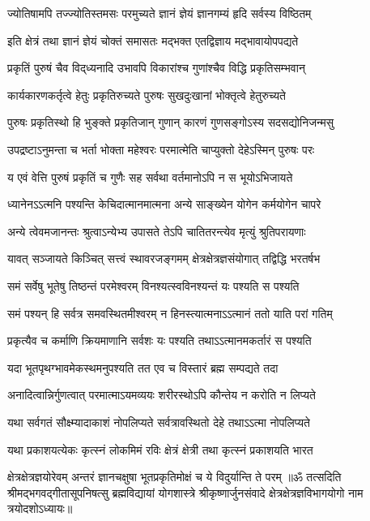 \twolineshloka
{ज्योतिषामपि तज्ज्योतिस्तमसः परमुच्यते}
{ज्ञानं ज्ञेयं ज्ञानगम्यं हृदि सर्वस्य विष्ठितम्}%

\twolineshloka
{इति क्षेत्रं तथा ज्ञानं ज्ञेयं चोक्तं समासतः}
{मद्भक्त एतद्विज्ञाय मद्भावायोपपद्यते}%

\twolineshloka
{प्रकृतिं पुरुषं चैव विद्‌ध्यनादि उभावपि}
{विकारांश्च गुणांश्चैव विद्धि प्रकृतिसम्भवान्}%

\twolineshloka
{कार्यकारणकर्तृत्वे हेतुः प्रकृतिरुच्यते}
{पुरुषः सुखदुःखानां भोक्तृत्वे हेतुरुच्यते}%

\twolineshloka
{पुरुषः प्रकृतिस्थो हि भुङ्क्ते प्रकृतिजान् गुणान्}
{कारणं गुणसङ्गोऽस्य सदसद्योनिजन्मसु}%

\twolineshloka
{उपद्रष्टाऽनुमन्ता च भर्ता भोक्ता महेश्वरः}
{परमात्मेति चाप्युक्तो देहेऽस्मिन् पुरुषः परः}%

\twolineshloka
{य एवं वेत्ति पुरुषं प्रकृतिं च गुणैः सह}
{सर्वथा वर्तमानोऽपि न स भूयोऽभिजायते}%

\twolineshloka
{ध्यानेनऽऽत्मनि पश्यन्ति केचिदात्मानमात्मना}
{अन्ये साङ्ख्येन योगेन कर्मयोगेन चापरे}%

\twolineshloka
{अन्ये त्वेवमजानन्तः श्रुत्वाऽन्येभ्य उपासते}
{तेऽपि चातितरन्त्येव मृत्युं श्रुतिपरायणाः}%

\twolineshloka
{यावत् सञ्जायते किञ्चित् सत्त्वं स्थावरजङ्गमम्}
{क्षेत्रक्षेत्रज्ञसंयोगात् तद्विद्धि भरतर्षभ}%

\twolineshloka
{समं सर्वेषु भूतेषु तिष्ठन्तं परमेश्वरम्}
{विनश्यत्स्वविनश्यन्तं यः पश्यति स पश्यति}%

\twolineshloka
{समं पश्यन् हि सर्वत्र समवस्थितमीश्वरम्}
{न हिनस्त्यात्मनाऽऽत्मानं ततो याति परां गतिम्}%

\twolineshloka
{प्रकृत्यैव च कर्माणि क्रियमाणानि सर्वशः}
{यः पश्यति तथाऽऽत्मानमकर्तारं स पश्यति}%

\twolineshloka
{यदा भूतपृथग्भावमेकस्थमनुपश्यति}
{तत एव च विस्तारं ब्रह्म सम्पद्यते तदा}%

\twolineshloka
{अनादित्वान्निर्गुणत्वात् परमात्माऽयमव्ययः}
{शरीरस्थोऽपि कौन्तेय न करोति न लिप्यते}%

\twolineshloka
{यथा सर्वगतं सौक्ष्म्यादाकाशं नोपलिप्यते}
{सर्वत्रावस्थितो देहे तथाऽऽत्मा नोपलिप्यते}%

\twolineshloka
{यथा प्रकाशयत्येकः कृत्स्नं लोकमिमं रविः}
{क्षेत्रं क्षेत्री तथा कृत्स्नं प्रकाशयति भारत}%

\twolineshloka
{क्षेत्रक्षेत्रज्ञयोरेवम् अन्तरं ज्ञानचक्षुषा}
{भूतप्रकृतिमोक्षं च ये विदुर्यान्ति ते परम्}%
{॥ॐ तत्सदिति श्रीमद्भगवद्गीतासूपनिषत्सु ब्रह्मविद्यायां योगशास्त्रे श्रीकृष्णार्जुनसंवादे क्षेत्रक्षेत्रज्ञविभागयोगो नाम त्रयोदशोऽध्यायः॥}